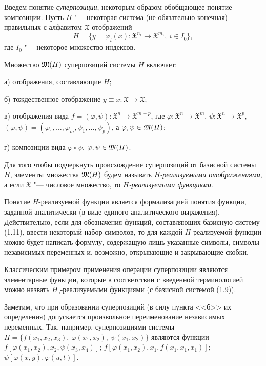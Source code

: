 Введем понятие \emph{суперпозиции}, некоторым образом обобщающее понятие
композиции. Пусть $H$ "--- некоторая система (не обязательно конечная)
правильных с алфавитом $\mathfrak X$ отображений
\begin{equation}\tag{1.11}
H=\{y=\varphi_i(x)\colon\mathfrak X^{n_i}\to\mathfrak X^{m_i},\ i\in I_0\},
\end{equation}
где $I_0$ "--- некоторое множество индексов.

Множество $\mathfrak M(H)$ суперпозиций системы $H$ включает:

а) отображения, составляющие $H$;

б) тождественное отображение $y\equiv x\colon\mathfrak X\to\mathfrak X$;

в) отображения вида
$f=(\varphi,\psi)\colon\mathfrak X^n\to\mathfrak X^{m+p}$, где
$\varphi\colon\mathfrak X^n\to\mathfrak X^m$,
$\psi\colon\mathfrak X^n\to\mathfrak X^p$,
$(\varphi,\psi)=(\varphi_1,\dots,\varphi_m,\psi_1,\dots,\psi_p)$,
а $\varphi,\psi\in\mathfrak M(H)$;

г) композиции вида $\varphi\circ\psi$, $\varphi,\psi\in\mathfrak M(H)$.
%

Для того чтобы подчеркнуть происхождение суперпозиций от базисной системы
$H$, элементы множества $\mathfrak M(H)$ будем называть \emph{$H$-реализуемыми
отображениями}, а если $\mathfrak X$ "--- числовое множество, то
\emph{$H$-реализуемыми функциями}.

Понятие $H$-реализуемой функции является формализацией понятия функции,
заданной аналитически (в виде единого аналитического выражения).
Действительно, если для обозначения функций, составляющих базисную систему
(1.11), ввести некоторый набор символов, то для каждой $H$-реализуемой
функции можно будет написать формулу, содержащую лишь указанные символы,
символы независимых переменных и, возможно, открывающие и закрывающие
скобки.

Классическим примером применения операции суперпозиции являются
элементарные функции, которые в соответствии с введенной терминологией
можно назвать $H_{\text{э}}$-реализуемыми функциями (с базисной системой
(1.9)).

Заметим, что при образовании суперпозиций (в силу пункта <<б>> их
определения) допускается произвольное переименование независимых
переменных. Так, например, суперпозициями системы
$H=\{f(x_1,x_2,x_3),\ \varphi(x_1,x_2),\ \psi(x_1,x_2)\}$ являются функции
$f[\varphi(x_1,x_2),x_2,\psi(x_3,x_4)]$;
$f[\varphi(x_1,x_2),x_1,f(x_1,x_1,x_1)]$; $\psi[\varphi(x,y),\varphi(u,t)]$.


